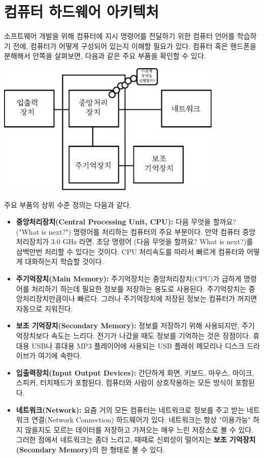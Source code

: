 \section{컴퓨터 하드웨어 아키텍처}

소프트웨어 개발을 위해 컴퓨터에 지시 명령어를 전달하기 위한 컴퓨터 언어를 학습하기 전에, 
컴퓨터가 어떻게 구성되어 있는지 이해할 필요가 있다. 
컴퓨터 혹은 핸드폰을 분해해서 안쪽을 살펴보면, 다음과 같은 주요 부품을 확인할 수 있다.

\beforefig
\centerline{\includegraphics[height=2.50in]{figs2/arch.eps}}
\afterfig

주요 부품의 상위 수준 정의는 다음과 같다.

\begin{itemize}

\item {\bf 중앙처리장치(Central Processing Unit, CPU):} 다음 무엇을 할까요? ("What is next?") 명령어를 처리하는 컴퓨터의 주요 부분이다. 
만약 컴퓨터 중앙처리장치가 3.0 GHz 라면, 초당 명령어 (다음 무엇을 할까요? What is next?)를 삼백만번 처리할 수 있다는 것이다. 
CPU 처리속도를 따라서 빠르게 컴퓨터와 어떻게 대화하는지 학습할 것이다.

\item {\bf 주기억장치(Main Memory):} 주기억장치는 중앙처리장치(CPU)가 급하게 명령어를 처리하기 하는데 필요한 정보를 저장하는 용도로 사용된다. 
주기억장치는 중앙처리장치만큼이나 빠르다. 그러나 주기억장치에 저장된 정보는 컴퓨터가 꺼지면 자동으로 지워진다.

\item {\bf 보조 기억장치(Secondary Memory):} 정보를 저장하기 위해 사용되지만, 주기억장치보다 속도는 느리다. 
전기가 나갔을 때도 정보를 기억하는 것은 장점이다. 
휴대용 USB나 휴대용 MP3 플레이어에 사용되는 USB 플래쉬 메모리나 디스크 드라이브가 여기에 속한다.
 
\item {\bf 입출력장치(Input Output Devices):} 간단하게 화면, 키보드, 마우스, 마이크, 스피커, 터치패드가 포함된다. 
컴퓨터와 사람이 상호작용하는 모든 방식이 포함된다.

\item {\bf 네트워크(Network):} 요즘 거의 모든 컴퓨터는 네트워크로 정보를 주고 받는 네트워크 연결(Network Connection) 하드웨어가 있다. 
네트워크는 항상 "이용가능" 하지 않을지도 모르는 데이터를 저장하고 가져오는 매우 느린 저장소로 볼 수 있다.
그러한 점에서 네트워크는 좀더 느리고, 때때로 신뢰성이 떨어지는 {\bf 보조 기억장치(Secondary Memory)}의 한 형태로 볼 수 있다.
\end{itemize}
 
